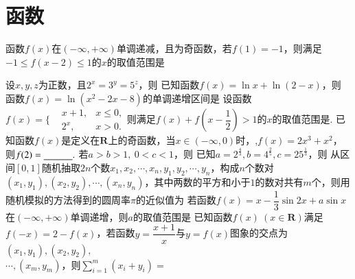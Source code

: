 \documentclass{BHCexam}
\begin{document}
	\fubiaoti{}
	\maketitle
	\tableofcontents
	\section{函数}
\begin{questions}
	\qs 函数$f(x)$在$ \left(-\infty,+\infty\right) $单调递减，且为奇函数，若$ f(1)=-1 $，则满足$ -1\le f(x-2)\le1 $的$ x $的取值范围是\xx
	\onech{$ \left[-2,2\right]$}{$ \left[-1,1\right]$}{$ \left[0,4\right]$}{$ \left[1,3\right]$}

	\qs  设$ x,y,z $为正数，且$ 2^x=3^y=5^z $，则\xx
	\qs 已知函数$f(x)=\ln x +\ln(2-x)$，则\xx
	\qs 函数$f(x)=\ln\left(x^2-2x-8\right)$的单调递增区间是\xx
		\qs 设函数$f(x)=\Bigg\{\begin{aligned}
	&x+1,&x\le0,\\
	&2^x,&x>0.
	\end{aligned}$则满足$ f(x)+f(x-\dfrac{1}{2})>1 $的$x$的取值范围是\tk.
	\qs 已知函数$f(x)$是定义在$ \mathbf{R} $上的奇函数，当$ x\in\left(-\infty,0\right) $时，,$ f(x)=2x^3+x^2 $，则$ f(2)=\underline{\hspace{3em}}. $
	\qs 若$ a>b>1,~0<c<1 $，则\xx
	\qs 已知$ a=2^{\frac{4}{3}} ,b=4^{\frac{2}{5}},c=25^{\frac{1}{3}}$，则\xx
  	\qs 从区间$ \left[0,1\right] $随机抽取$ 2n $个数$ x_1,x_2,\cdots,x_n,y_1,y_2,\cdots,y_n $，构成$ n $个数对$\left(x_1,y_1\right)  ,\left(x_2,y_2\right),\cdots,\left(x_n,y_n\right)$，其中两数的平方和小于$ 1 $的数对共有$ m $个，则用随机模拟的方法得到的圆周率$ \pi $的近似值为\xx
  	\question
  	若函数$f(x)=x-\dfrac{1}{3}\sin 2x+a\sin x$在$(-\infty,+\infty)$单调递增，则$a$的取值范围是\xx
  	\qs 已知函数$f(x)~(x\in \mathbf{R})$满足$f(-x)=2-f(x)$，若函数$y=\dfrac{x+1}{x}$与$y=f(x)$图象的交点为$(x_1,y_1),(x_2,y_2),$\\$\cdots,(x_m,y_m)$，则$\sum\limits_{i=1}^{m}(x_i+y_i)=$\xx

\end{questions}
\end{document}
